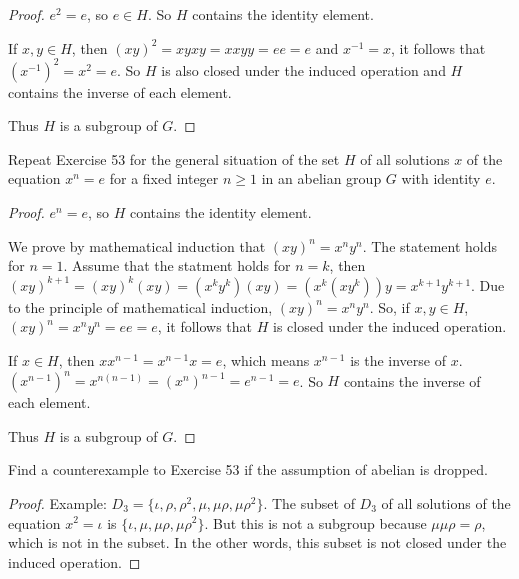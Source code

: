 \begin{proof}
    $e^{2} = e$, so $e\in H$. So $H$ contains the identity element.

    If $x, y\in H$, then ${(xy)}^{2} = xyxy = xxyy = ee = e$ and $x^{-1} = x$, it follows that ${(x^{-1})}^{2} = x^{2} = e$. So $H$ is also closed under the induced operation and $H$ contains the inverse of each element.

    Thus $H$ is a subgroup of $G$.
\end{proof}

\newpage
\begin{exercise}
    Repeat Exercise 53 for the general situation of the set $H$ of all solutions $x$ of the equation $x^{n} = e$ for a fixed integer $n \geq 1$ in an abelian group $G$ with identity $e$.
\end{exercise}

\begin{proof}
    $e^{n} = e$, so $H$ contains the identity element.

    We prove by mathematical induction that ${(xy)}^{n} = x^{n}y^{n}$. The statement holds for $n = 1$. Assume that the statment holds for $n = k$, then ${(xy)}^{k+1} = {(xy)}^{k}(xy) = (x^{k}y^{k})(xy) = (x^{k}(xy^{k}))y = x^{k+1}y^{k+1}$. Due to the principle of mathematical induction, ${(xy)}^{n} = x^{n}y^{n}$. So, if $x, y\in H$, ${(xy)}^{n} = x^{n}y^{n} = ee = e$, it follows that $H$ is closed under the induced operation.

    If $x\in H$, then $xx^{n-1} = x^{n-1}x = e$, which means $x^{n-1}$ is the inverse of $x$. ${(x^{n-1})}^{n} = x^{n(n-1)} = {(x^{n})}^{n-1} = e^{n-1} = e$. So $H$ contains the inverse of each element.

    Thus $H$ is a subgroup of $G$.
\end{proof}

\newpage
\begin{exercise}
    Find a counterexample to Exercise 53 if the assumption of abelian is dropped.
\end{exercise}

\begin{proof}
    Example: $D_{3} = \{ \iota, \rho, \rho^{2}, \mu, \mu\rho, \mu\rho^{2} \}$. The subset of $D_{3}$ of all solutions of the equation $x^{2} = \iota$ is $\{ \iota, \mu, \mu\rho, \mu\rho^{2} \}$. But this is not a subgroup because $\mu\mu\rho = \rho$, which is not in the subset. In the other words, this subset is not closed under the induced operation.
\end{proof}

